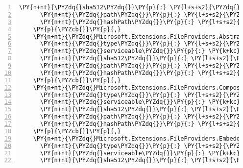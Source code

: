 \begin{Verbatim}[commandchars=\\\{\},numbers=left,firstnumber=1,stepnumber=1,numberblanklines=0]
      \PY{n+nt}{\PYZdq{}sha512\PYZdq{}}\PY{p}{:} \PY{l+s+s2}{\PYZdq{}sha512\PYZhy{}L3u2tsqPQiLwbMUSlg5BM7WuIRWNn7OXgW2otSnng2Th0lOfVYymwwas9RZuitsvVBFRX3nqnLGpJn2KmIRuFQ==\PYZdq{}}\PY{p}{,}
      \PY{n+nt}{\PYZdq{}path\PYZdq{}}\PY{p}{:} \PY{l+s+s2}{\PYZdq{}microsoft.extensions.diagnosticadapter/2.1.0\PYZhy{}rc1\PYZhy{}final\PYZdq{}}\PY{p}{,}
      \PY{n+nt}{\PYZdq{}hashPath\PYZdq{}}\PY{p}{:} \PY{l+s+s2}{\PYZdq{}microsoft.extensions.diagnosticadapter.2.1.0\PYZhy{}rc1\PYZhy{}final.nupkg.sha512\PYZdq{}}
    \PY{p}{\PYZcb{}}\PY{p}{,}
    \PY{n+nt}{\PYZdq{}Microsoft.Extensions.FileProviders.Abstractions/2.1.0\PYZhy{}rc1\PYZhy{}final\PYZdq{}}\PY{p}{:} \PY{p}{\PYZob{}}
      \PY{n+nt}{\PYZdq{}type\PYZdq{}}\PY{p}{:} \PY{l+s+s2}{\PYZdq{}package\PYZdq{}}\PY{p}{,}
      \PY{n+nt}{\PYZdq{}serviceable\PYZdq{}}\PY{p}{:} \PY{k+kc}{true}\PY{p}{,}
      \PY{n+nt}{\PYZdq{}sha512\PYZdq{}}\PY{p}{:} \PY{l+s+s2}{\PYZdq{}sha512\PYZhy{}Sk5B2tdO86jinoW3TRQTlde5svt7fRzKftiCa5lBIRHoYlfn2tdL2i2U2v+D2YmQUMNclPcwIGPUaZkPFEjX0Q==\PYZdq{}}\PY{p}{,}
      \PY{n+nt}{\PYZdq{}path\PYZdq{}}\PY{p}{:} \PY{l+s+s2}{\PYZdq{}microsoft.extensions.fileproviders.abstractions/2.1.0\PYZhy{}rc1\PYZhy{}final\PYZdq{}}\PY{p}{,}
      \PY{n+nt}{\PYZdq{}hashPath\PYZdq{}}\PY{p}{:} \PY{l+s+s2}{\PYZdq{}microsoft.extensions.fileproviders.abstractions.2.1.0\PYZhy{}rc1\PYZhy{}final.nupkg.sha512\PYZdq{}}
    \PY{p}{\PYZcb{}}\PY{p}{,}
    \PY{n+nt}{\PYZdq{}Microsoft.Extensions.FileProviders.Composite/2.1.0\PYZhy{}rc1\PYZhy{}final\PYZdq{}}\PY{p}{:} \PY{p}{\PYZob{}}
      \PY{n+nt}{\PYZdq{}type\PYZdq{}}\PY{p}{:} \PY{l+s+s2}{\PYZdq{}package\PYZdq{}}\PY{p}{,}
      \PY{n+nt}{\PYZdq{}serviceable\PYZdq{}}\PY{p}{:} \PY{k+kc}{true}\PY{p}{,}
      \PY{n+nt}{\PYZdq{}sha512\PYZdq{}}\PY{p}{:} \PY{l+s+s2}{\PYZdq{}sha512\PYZhy{}UEb39R3iTuRrnGd7qRt+juVBS26hFh5WUXBnwgDNf845HhXIp8tDdG7JgM7nz8untb4SGEvKNMTu6Lk8K9XvOw==\PYZdq{}}\PY{p}{,}
      \PY{n+nt}{\PYZdq{}path\PYZdq{}}\PY{p}{:} \PY{l+s+s2}{\PYZdq{}microsoft.extensions.fileproviders.composite/2.1.0\PYZhy{}rc1\PYZhy{}final\PYZdq{}}\PY{p}{,}
      \PY{n+nt}{\PYZdq{}hashPath\PYZdq{}}\PY{p}{:} \PY{l+s+s2}{\PYZdq{}microsoft.extensions.fileproviders.composite.2.1.0\PYZhy{}rc1\PYZhy{}final.nupkg.sha512\PYZdq{}}
    \PY{p}{\PYZcb{}}\PY{p}{,}
    \PY{n+nt}{\PYZdq{}Microsoft.Extensions.FileProviders.Embedded/2.1.0\PYZhy{}rc1\PYZhy{}final\PYZdq{}}\PY{p}{:} \PY{p}{\PYZob{}}
      \PY{n+nt}{\PYZdq{}type\PYZdq{}}\PY{p}{:} \PY{l+s+s2}{\PYZdq{}package\PYZdq{}}\PY{p}{,}
      \PY{n+nt}{\PYZdq{}serviceable\PYZdq{}}\PY{p}{:} \PY{k+kc}{true}\PY{p}{,}
      \PY{n+nt}{\PYZdq{}sha512\PYZdq{}}\PY{p}{:} \PY{l+s+s2}{\PYZdq{}sha512\PYZhy{}QRvS+CUZObJ9jouXyRaxFGH2F5R8r7TXIvN8rjzo5L25hFdIgs+zH9OaNcGMNFrQhT8n3LYzoO/Uxdb64Qc6+g==\PYZdq{}}\PY{p}{,}

\end{Verbatim}
